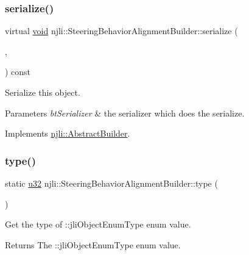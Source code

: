\subsubsection{\texorpdfstring{serialize()}{serialize()}}
{\footnotesize\ttfamily virtual \mbox{\hyperlink{_thread_8h_af1e856da2e658414cb2456cb6f7ebc66}{void}} njli\+::\+Steering\+Behavior\+Alignment\+Builder\+::serialize (\begin{DoxyParamCaption}\item[{\mbox{\hyperlink{_thread_8h_af1e856da2e658414cb2456cb6f7ebc66}{void}} $\ast$}]{,  }\item[{bt\+Serializer $\ast$}]{ }\end{DoxyParamCaption}) const\hspace{0.3cm}{\ttfamily [virtual]}}

Serialize this object.


\begin{DoxyParams}{Parameters}
{\em bt\+Serializer} & the serializer which does the serialize. \\
\hline
\end{DoxyParams}


Implements \mbox{\hyperlink{classnjli_1_1_abstract_builder_ab66b774e02ccb9da554c9aab7fa6d981}{njli\+::\+Abstract\+Builder}}.

\mbox{\label{classnjli_1_1_steering_behavior_alignment_builder_a723346123c63ab5b229ce19e474178f5}} 
\subsubsection{\texorpdfstring{type()}{type()}}
{\footnotesize\ttfamily static \mbox{\hyperlink{_util_8h_a10e94b422ef0c20dcdec20d31a1f5049}{u32}} njli\+::\+Steering\+Behavior\+Alignment\+Builder\+::type (\begin{DoxyParamCaption}{ }\end{DoxyParamCaption})\hspace{0.3cm}{\ttfamily [static]}}

Get the type of \+::jli\+Object\+Enum\+Type enum value.

\begin{DoxyReturn}{Returns}
The \+::jli\+Object\+Enum\+Type enum value. 
\end{DoxyReturn}


